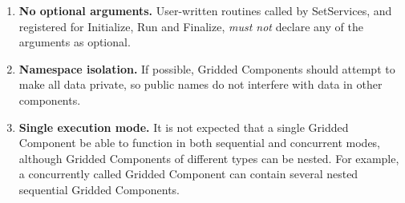 %


\begin{enumerate}

\item {\bf No optional arguments.} User-written routines called by SetServices,
and registered for Initialize, Run and Finalize, {\em must not} declare any
of the arguments as optional.

\item {\bf Namespace isolation.}
If possible, Gridded Components should attempt to make 
all data private, so public names do not interfere with data 
in other components.

\item {\bf Single execution mode.}
It is not expected that a single Gridded Component be able 
to function in both sequential and concurrent modes, although 
Gridded Components of different types can be nested. For example,
a concurrently called Gridded Component can contain several nested 
sequential Gridded Components. 

\end{enumerate}

